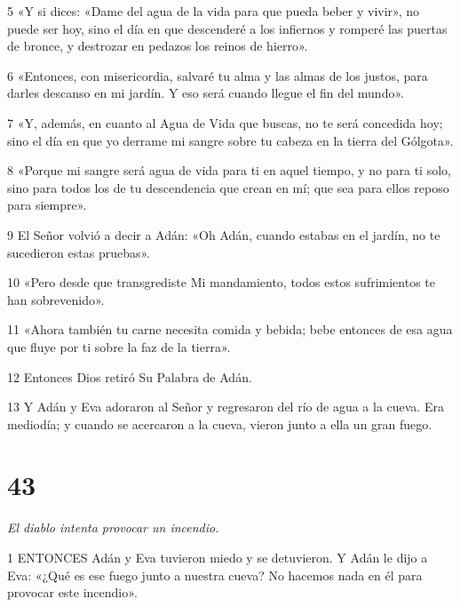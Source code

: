 \par 5 «Y si dices: «Dame del agua de la vida para que pueda beber y vivir», no puede ser hoy, sino el día en que descenderé a los infiernos y romperé las puertas de bronce, y destrozar en pedazos los reinos de hierro».

\par 6 «Entonces, con misericordia, salvaré tu alma y las almas de los justos, para darles descanso en mi jardín. Y eso será cuando llegue el fin del mundo».

\par 7 «Y, además, en cuanto al Agua de Vida que buscas, no te será concedida hoy; sino el día en que yo derrame mi sangre sobre tu cabeza en la tierra del Gólgota».

\par 8 «Porque mi sangre será agua de vida para ti en aquel tiempo, y no para ti solo, sino para todos los de tu descendencia que crean en mí; que sea para ellos reposo para siempre».

\par 9 El Señor volvió a decir a Adán: «Oh Adán, cuando estabas en el jardín, no te sucedieron estas pruebas».

\par 10 «Pero desde que transgrediste Mi mandamiento, todos estos sufrimientos te han sobrevenido».

\par 11 «Ahora también tu carne necesita comida y bebida; bebe entonces de esa agua que fluye por ti sobre la faz de la tierra».

\par 12 Entonces Dios retiró Su Palabra de Adán.

\par 13 Y Adán y Eva adoraron al Señor y regresaron del río de agua a la cueva. Era mediodía; y cuando se acercaron a la cueva, vieron junto a ella un gran fuego.

\chapter{43}

\par \textit{El diablo intenta provocar un incendio.}

\par 1 ENTONCES Adán y Eva tuvieron miedo y se detuvieron. Y Adán le dijo a Eva: «¿Qué es ese fuego junto a nuestra cueva? No hacemos nada en él para provocar este incendio».

